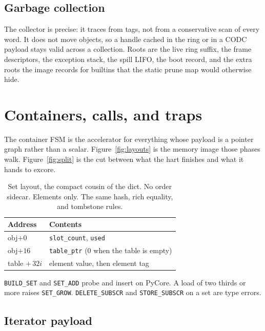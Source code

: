 \documentclass[11pt,a4paper]{article}
\begin{document}
\subsection{Garbage collection}



The collector is precise: it traces from tags, not from a conservative scan
of every word.
It does not move objects, so a handle cached in the ring or in a CODC payload
stays valid across a collection.
Roots are the live ring suffix, the frame descriptors, the exception stack,
the spill LIFO, the boot record, and the extra roots the image records for
builtins that the static prune map would otherwise hide.

\section{Containers, calls, and traps}
\label{sec:obj}

The container FSM is the accelerator for everything whose payload is a
pointer graph rather than a scalar.
Figure~\ref{fig:layouts} is the memory image those phases walk.
Figure~\ref{fig:split} is the cut between what the hart finishes and what
it hands to excore.



\begin{table}[htbp]
\centering
\caption{Set layout, the compact cousin of the dict.
No order sidecar. Elements only. The same hash, rich equality, and tombstone rules.}
\label{tab:set}
\small
\begin{tabular}{@{}lp{}@{}}
\toprule
Address & Contents \\
\midrule
obj$+0$ & \texttt{slot\_count}, \texttt{used} \\
obj$+16$ & \texttt{table\_ptr} (0 when the table is empty) \\
table $+\,32i$ & element value, then element tag \\
\bottomrule
\end{tabular}
\end{table}

\texttt{BUILD\_SET} and \texttt{SET\_ADD} probe and insert on PyCore.
A load of two thirds or more raises \texttt{SET\_GROW}.
\texttt{DELETE\_SUBSCR} and \texttt{STORE\_SUBSCR} on a set are type errors.

\subsection{Iterator payload}
\end{document}
